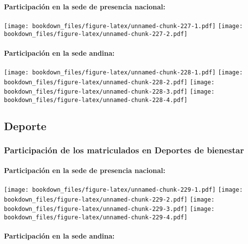 \documentclass[]{article}
\let\oldparagraph\paragraph
\renewcommand{\paragraph}[1]{\oldparagraph{#1}\mbox{}}
\theoremstyle{definition}
\theoremstyle{definition}
\theoremstyle{definition}
\theoremstyle{remark}
\begin{document}
\paragraph{Participación en la sede de presencia
nacional:}\label{participacion-en-la-sede-de-presencia-nacional-26}

\texttt{[image: bookdown\_files/figure-latex/unnamed-chunk-227-1.pdf]}
\texttt{[image: bookdown\_files/figure-latex/unnamed-chunk-227-2.pdf]}

\paragraph{Participación en la sede
andina:}\label{participacion-en-la-sede-andina-26}

\texttt{[image: bookdown\_files/figure-latex/unnamed-chunk-228-1.pdf]}
\texttt{[image: bookdown\_files/figure-latex/unnamed-chunk-228-2.pdf]}
\texttt{[image: bookdown\_files/figure-latex/unnamed-chunk-228-3.pdf]}
\texttt{[image: bookdown\_files/figure-latex/unnamed-chunk-228-4.pdf]}

\subsection{Deporte}\label{deporte-1}

\subsubsection{Participación de los matriculados en Deportes de
bienestar}\label{participacion-de-los-matriculados-en-deportes-de-bienestar-1}

\paragraph{Participación en la sede de presencia
nacional:}\label{participacion-en-la-sede-de-presencia-nacional-27}

\texttt{[image: bookdown\_files/figure-latex/unnamed-chunk-229-1.pdf]}
\texttt{[image: bookdown\_files/figure-latex/unnamed-chunk-229-2.pdf]}
\texttt{[image: bookdown\_files/figure-latex/unnamed-chunk-229-3.pdf]}
\texttt{[image: bookdown\_files/figure-latex/unnamed-chunk-229-4.pdf]}

\paragraph{Participación en la sede
andina:}\label{participacion-en-la-sede-andina-27}
\end{document}
